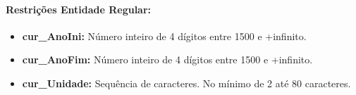 \documentclass{report}
\begin{document}
\paragraph{Restrições Entidade Regular:}
\begin{itemize}
  \item \textbf{cur\_AnoIni:} Número inteiro de 4 dígitos entre 1500 e +infinito.
   \item \textbf{cur\_AnoFim:} Número inteiro de 4 dígitos entre 1500 e +infinito.
   \item \textbf{cur\_Unidade:} Sequência de caracteres. No mínimo de 2 até 80 caracteres.
\end{itemize}

\iffalse
\subsection{Obrigatória:}	
\begin{itemize}
  \item 
\end{itemize}
\begin{tikzpicture}
  \node[entity] (node1) {Obrigatoria};
\end{tikzpicture}


\subsection{Optativa:}	
\begin{itemize}
 \item
\end{itemize}
\begin{tikzpicture}
 \node[entity] (node1) {Optativa};
\end{tikzpicture}

\subsection{Eletiva:}
\begin{itemize}
  \item
\end{itemize}
\begin{tikzpicture}
  \node[entity] (node1) {Eletiva};
\end{tikzpicture}

\subsection{Livre:}
\begin{itemize}
  \item
\end{itemize}
\begin{tikzpicture}
  \node[entity] (node1) {Livre};
\end{tikzpicture}
\fi
\end{document}
